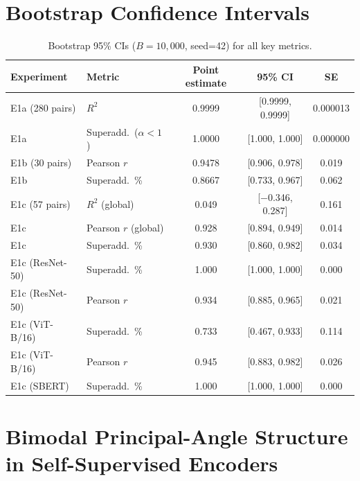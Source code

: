 \documentclass{article}
\begin{document}
\section{Bootstrap Confidence Intervals}
\label{app:bootstrap}

\begin{table}[h]
\centering
\caption{Bootstrap 95\% CIs ($B=10{,}000$, seed=42) for all key metrics.}
\label{tab:bootstrap_ci}
\begin{tabular}{llccc}
\toprule
Experiment & Metric & Point estimate & 95\% CI & SE \\
\midrule
E1a (280 pairs)  & $R^2$                  & 0.9999 & [0.9999, 0.9999] & 0.000013 \\
E1a                & Superadd.\ ($\alpha<1$) & 1.0000 & [1.000, 1.000]  & 0.000000 \\
E1b (30 pairs)     & Pearson $r$             & 0.9478 & [0.906, 0.978]  & 0.019 \\
E1b                & Superadd.\ \%          & 0.8667 & [0.733, 0.967]  & 0.062 \\
E1c (57 pairs)     & $R^2$ (global)         & 0.049  & [$-$0.346, 0.287] & 0.161 \\
E1c                & Pearson $r$ (global)    & 0.928  & [0.894, 0.949]  & 0.014 \\
E1c                & Superadd.\ \%          & 0.930  & [0.860, 0.982]  & 0.034 \\
E1c (ResNet-50)    & Superadd.\ \%          & 1.000  & [1.000, 1.000]  & 0.000 \\
E1c (ResNet-50)    & Pearson $r$             & 0.934  & [0.885, 0.965]  & 0.021 \\
E1c (ViT-B/16)     & Superadd.\ \%          & 0.733  & [0.467, 0.933]  & 0.114 \\
E1c (ViT-B/16)     & Pearson $r$             & 0.945  & [0.883, 0.982]  & 0.026 \\
E1c (SBERT)        & Superadd.\ \%          & 1.000  & [1.000, 1.000]  & 0.000 \\
\bottomrule
\end{tabular}
\end{table}

\section{Bimodal Principal-Angle Structure in Self-Supervised Encoders}
\label{app:bimodal}
\end{document}
